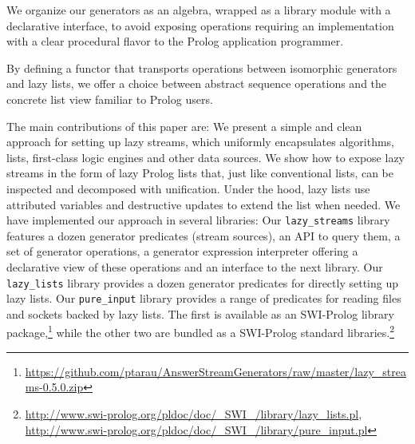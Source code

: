 \documentclass[submission,copyright,creativecommons]{eptcs}
\begin{document}
We organize our generators as an algebra, wrapped as a library module with a declarative interface, to avoid exposing  operations requiring an implementation with a clear procedural flavor to the Prolog application programmer.

By defining a functor that transports operations between isomorphic
generators and lazy lists, we offer a choice between 
abstract sequence operations and the concrete list view familiar to Prolog users.



The main contributions of this paper are:
\BI
\I We present a simple and clean approach for setting up lazy streams, which
   uniformly encapsulates algorithms, lists, first-class logic engines and other data sources.
\I We show how to expose lazy streams in the form of lazy Prolog lists
   that, just like conventional lists, can be inspected and decomposed with unification.
   Under the hood, lazy lists use attributed variables and destructive updates to
   extend the list when needed.
\I We have implemented our approach in several libraries:
   \BE 
   \I Our \texttt{lazy\_streams} library
features a dozen generator predicates (stream sources), an API to query
them, a set of generator  operations, a generator expression interpreter
offering a declarative view of these operations and an interface to
the next library. 
   \I Our \texttt{lazy\_lists} library provides a dozen generator predicates for 
      directly setting up lazy lists.
   \I Our \texttt{pure\_input} library provides a range of predicates for reading
      files and sockets backed by lazy lists.
   \EE
   The first is available as an SWI-Prolog
library package,\footnote{%
\url{https://github.com/ptarau/AnswerStreamGenerators/raw/master/lazy_streams-0.5.0.zip}}
  while the other two are bundled as a SWI-Prolog standard libraries.\footnote{%
\url{http://www.swi-prolog.org/pldoc/doc/_SWI_/library/lazy_lists.pl},
\url{http://www.swi-prolog.org/pldoc/doc/_SWI_/library/pure_input.pl}}
\EI
\end{document}
